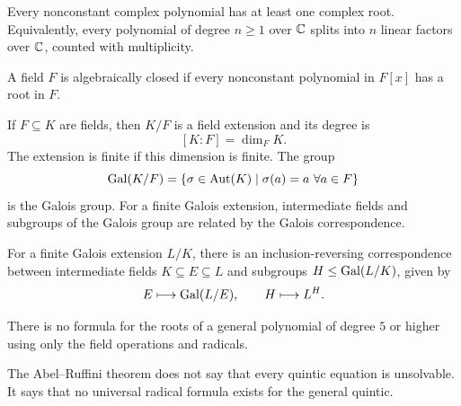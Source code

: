     \begin{theorem}
        Every nonconstant complex polynomial has at least one complex root.
        Equivalently, every polynomial of degree $n\geq 1$ over $\mathbb{C}$ splits into
        $n$ linear factors over $\mathbb{C}$, counted with multiplicity.
    \end{theorem}

    \begin{definition}
        A field $F$ is algebraically closed if every nonconstant polynomial in
        $F[x]$ has a root in $F$.
    \end{definition}

    \begin{definition}
        If $F\subseteq K$ are fields, then $K/F$ is a field extension and its
        degree is
        \[
            [K:F]=\dim_F K.
        \]
        The extension is finite if this dimension is finite. The group
        \[
            \operatorname{Gal}(K/F)
            =
            \{\sigma\in\operatorname{Aut}(K)\mid \sigma(a)=a\ \forall a\in F\}
        \]
        is the Galois group. For a finite Galois extension, intermediate fields
        and subgroups of the Galois group are related by the Galois
        correspondence.
    \end{definition}

    \begin{theorem}
        For a finite Galois extension $L/K$, there is an inclusion-reversing
        correspondence between intermediate fields $K\subseteq E\subseteq L$ and
        subgroups $H\leq \operatorname{Gal}(L/K)$, given by
        \[
            E\longmapsto \operatorname{Gal}(L/E),
            \qquad
            H\longmapsto L^H.
        \]
    \end{theorem}

    \begin{theorem}
        There is no formula for the roots of a general polynomial of degree $5$
        or higher using only the field operations and radicals.
    \end{theorem}

    \begin{remark}
        The Abel--Ruffini theorem does not say that every quintic equation is
        unsolvable. It says that no universal radical formula exists for the
        general quintic.
    \end{remark}

